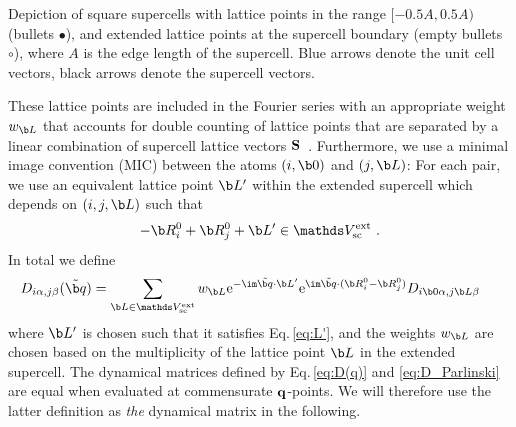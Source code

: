 \begin{marginfigure}[0cm]
	\caption{Depiction of square supercells with lattice points in the range $[-0.5 A, 0.5 A)$ (bullets $\bullet$), and extended lattice points at the supercell boundary (empty bullets $\circ$), where $A$ is the edge length of the supercell. Blue arrows denote the unit cell vectors, black arrows denote the supercell vectors.}
	\label{fig:sketch_supercells}
\end{marginfigure}
These lattice points are included in the Fourier series with an appropriate weight $w_{\b L}$ that accounts for double counting of lattice points that are separated by a linear combination of supercell lattice vectors $\bf S$~\cite{Parlinski1997}. Furthermore, we use a minimal image convention (MIC) between the atoms $(i, \b 0)$ and $(j, \b L)$: For each pair, we use an equivalent lattice point $\b L'$ within the extended supercell which depends on $(i, j, \b L)$ such that
\begin{align}
	- \b R_{i}^0 + \b R_{j}^0 + \b L' \in \mathds V_{\rm sc}^{\rm ext}~.
	\label{eq:L'}
\end{align}
In total we define
\begin{align}
	{D}_{i \alpha, j \beta} (\tilde{\b q}) 	
		&= %
		\sum_{\b L \in \mathds V_{\rm sc}^{\rm ext}} 
			w_{\b L}
		{\rm e}^{- \im \tilde{\b q} \cdot \b L'} {\rm e}^{\im \tilde{\b q} \cdot (\b R_i^0 - \b R_j^0)} {D}_{i \b 0 \alpha, j \b L \beta}~
	\label{eq:D_Parlinski}
\end{align}
where $\b L'$ is chosen such that it satisfies Eq.\,\eqref{eq:L'}, and the weights $w_{\b L}$ are chosen based on the multiplicity of the lattice point $\b L$ in the extended supercell. The dynamical matrices defined by Eq.\,\eqref{eq:D(q)} and \eqref{eq:D_Parlinski} are equal when evaluated at commensurate $\bf q$-points. We will therefore use the latter definition as \emph{the} dynamical matrix in the following.

